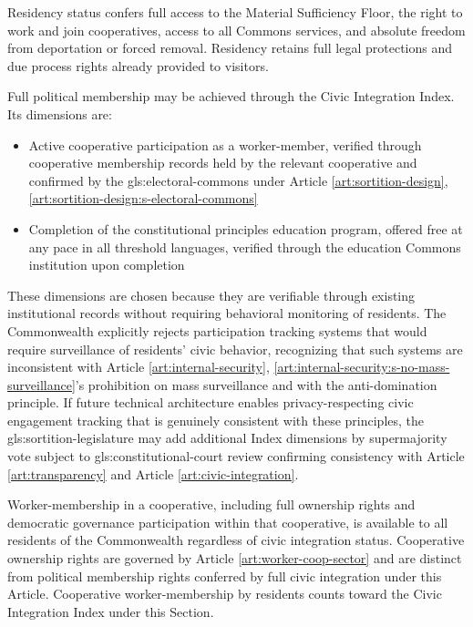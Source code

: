 Residency status confers full access to the Material Sufficiency Floor, the right to work and join cooperatives, access to all Commons services, and absolute freedom from deportation or forced removal. Residency retains full legal protections and due process rights already provided to visitors.

Full political membership may be achieved through the Civic Integration Index. Its dimensions are:
\begin{itemize}
  \item Active cooperative participation as a worker-member, verified through cooperative membership records held by the relevant cooperative and confirmed by the \gls{gls:electoral-commons} under Article \ref{art:sortition-design}, \ref{art:sortition-design:s-electoral-commons}
  \item Completion of the constitutional principles education program, offered free at any pace in all threshold languages, verified through the education Commons institution upon completion
\end{itemize}

These dimensions are chosen because they are verifiable through existing institutional records without requiring behavioral monitoring of residents. The Commonwealth explicitly rejects participation tracking systems that would require surveillance of residents' civic behavior, recognizing that such systems are inconsistent with Article \ref{art:internal-security}, \ref{art:internal-security:s-no-mass-surveillance}'s prohibition on mass surveillance and with the anti-domination principle. If future technical architecture enables privacy-respecting civic engagement tracking that is genuinely consistent with these principles, the \gls{gls:sortition-legislature} may add additional Index dimensions by supermajority vote subject to \gls{gls:constitutional-court} review confirming consistency with Article \ref{art:transparency} and Article \ref{art:civic-integration}.

Worker-membership in a cooperative, including full ownership rights and democratic governance participation within that cooperative, is available to all residents of the Commonwealth regardless of civic integration status. Cooperative ownership rights are governed by Article \ref{art:worker-coop-sector} and are distinct from political membership rights conferred by full civic integration under this Article. Cooperative worker-membership by residents counts toward the Civic Integration Index under this Section.


